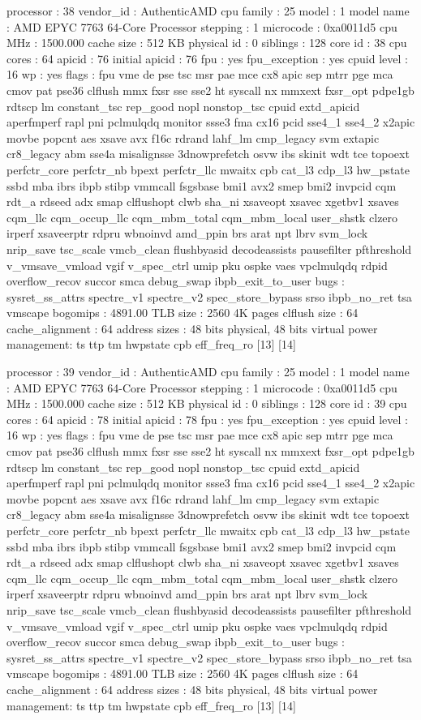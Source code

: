 processor	: 38
vendor_id	: AuthenticAMD
cpu family	: 25
model		: 1
model name	: AMD EPYC 7763 64-Core Processor
stepping	: 1
microcode	: 0xa0011d5
cpu MHz		: 1500.000
cache size	: 512 KB
physical id	: 0
siblings	: 128
core id		: 38
cpu cores	: 64
apicid		: 76
initial apicid	: 76
fpu		: yes
fpu_exception	: yes
cpuid level	: 16
wp		: yes
flags		: fpu vme de pse tsc msr pae mce cx8 apic sep mtrr pge mca cmov pat pse36 clflush mmx fxsr sse sse2 ht syscall nx mmxext fxsr_opt pdpe1gb rdtscp lm constant_tsc rep_good nopl nonstop_tsc cpuid extd_apicid aperfmperf rapl pni pclmulqdq monitor ssse3 fma cx16 pcid sse4_1 sse4_2 x2apic movbe popcnt aes xsave avx f16c rdrand lahf_lm cmp_legacy svm extapic cr8_legacy abm sse4a misalignsse 3dnowprefetch osvw ibs skinit wdt tce topoext perfctr_core perfctr_nb bpext perfctr_llc mwaitx cpb cat_l3 cdp_l3 hw_pstate ssbd mba ibrs ibpb stibp vmmcall fsgsbase bmi1 avx2 smep bmi2 invpcid cqm rdt_a rdseed adx smap clflushopt clwb sha_ni xsaveopt xsavec xgetbv1 xsaves cqm_llc cqm_occup_llc cqm_mbm_total cqm_mbm_local user_shstk clzero irperf xsaveerptr rdpru wbnoinvd amd_ppin brs arat npt lbrv svm_lock nrip_save tsc_scale vmcb_clean flushbyasid decodeassists pausefilter pfthreshold v_vmsave_vmload vgif v_spec_ctrl umip pku ospke vaes vpclmulqdq rdpid overflow_recov succor smca debug_swap ibpb_exit_to_user
bugs		: sysret_ss_attrs spectre_v1 spectre_v2 spec_store_bypass srso ibpb_no_ret tsa vmscape
bogomips	: 4891.00
TLB size	: 2560 4K pages
clflush size	: 64
cache_alignment	: 64
address sizes	: 48 bits physical, 48 bits virtual
power management: ts ttp tm hwpstate cpb eff_freq_ro [13] [14]

processor	: 39
vendor_id	: AuthenticAMD
cpu family	: 25
model		: 1
model name	: AMD EPYC 7763 64-Core Processor
stepping	: 1
microcode	: 0xa0011d5
cpu MHz		: 1500.000
cache size	: 512 KB
physical id	: 0
siblings	: 128
core id		: 39
cpu cores	: 64
apicid		: 78
initial apicid	: 78
fpu		: yes
fpu_exception	: yes
cpuid level	: 16
wp		: yes
flags		: fpu vme de pse tsc msr pae mce cx8 apic sep mtrr pge mca cmov pat pse36 clflush mmx fxsr sse sse2 ht syscall nx mmxext fxsr_opt pdpe1gb rdtscp lm constant_tsc rep_good nopl nonstop_tsc cpuid extd_apicid aperfmperf rapl pni pclmulqdq monitor ssse3 fma cx16 pcid sse4_1 sse4_2 x2apic movbe popcnt aes xsave avx f16c rdrand lahf_lm cmp_legacy svm extapic cr8_legacy abm sse4a misalignsse 3dnowprefetch osvw ibs skinit wdt tce topoext perfctr_core perfctr_nb bpext perfctr_llc mwaitx cpb cat_l3 cdp_l3 hw_pstate ssbd mba ibrs ibpb stibp vmmcall fsgsbase bmi1 avx2 smep bmi2 invpcid cqm rdt_a rdseed adx smap clflushopt clwb sha_ni xsaveopt xsavec xgetbv1 xsaves cqm_llc cqm_occup_llc cqm_mbm_total cqm_mbm_local user_shstk clzero irperf xsaveerptr rdpru wbnoinvd amd_ppin brs arat npt lbrv svm_lock nrip_save tsc_scale vmcb_clean flushbyasid decodeassists pausefilter pfthreshold v_vmsave_vmload vgif v_spec_ctrl umip pku ospke vaes vpclmulqdq rdpid overflow_recov succor smca debug_swap ibpb_exit_to_user
bugs		: sysret_ss_attrs spectre_v1 spectre_v2 spec_store_bypass srso ibpb_no_ret tsa vmscape
bogomips	: 4891.00
TLB size	: 2560 4K pages
clflush size	: 64
cache_alignment	: 64
address sizes	: 48 bits physical, 48 bits virtual
power management: ts ttp tm hwpstate cpb eff_freq_ro [13] [14]

